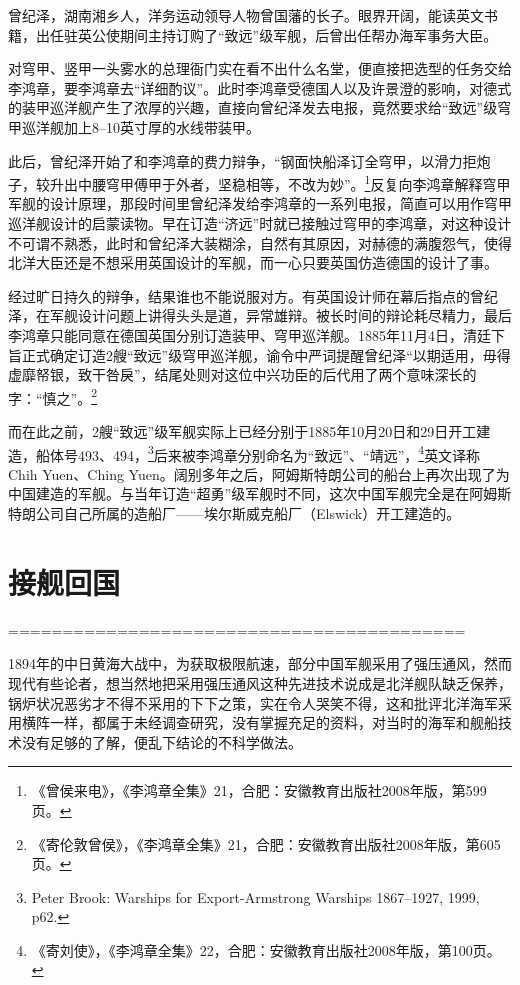 \documentclass[12pt,UTF8]{ctexbook}
\begin{document}
曾纪泽，湖南湘乡人，洋务运动领导人物曾国藩的长子。眼界开阔，能读英文书籍，出任驻英公使期间主持订购了“致远”级军舰，后曾出任帮办海军事务大臣。

对穹甲、竖甲一头雾水的总理衙门实在看不出什么名堂，便直接把选型的任务交给李鸿章，要李鸿章去“详细酌议”。此时李鸿章受德国人以及许景澄的影响，对德式的装甲巡洋舰产生了浓厚的兴趣，直接向曾纪泽发去电报，竟然要求给“致远”级穹甲巡洋舰加上8--10英寸厚的水线带装甲。

此后，曾纪泽开始了和李鸿章的费力辩争，“钢面快船泽订全穹甲，以滑力拒炮子，较升出中腰穹甲傅甲于外者，坚稳相等，不改为妙”。\footnote{《曾侯来电》，《李鸿章全集》21，合肥：安徽教育出版社2008年版，第599页。}反复向李鸿章解释穹甲军舰的设计原理，那段时间里曾纪泽发给李鸿章的一系列电报，简直可以用作穹甲巡洋舰设计的启蒙读物。早在订造“济远”时就已接触过穹甲的李鸿章，对这种设计不可谓不熟悉，此时和曾纪泽大装糊涂，自然有其原因，对赫德的满腹怨气，使得北洋大臣还是不想采用英国设计的军舰，而一心只要英国仿造德国的设计了事。

经过旷日持久的辩争，结果谁也不能说服对方。有英国设计师在幕后指点的曾纪泽，在军舰设计问题上讲得头头是道，异常雄辩。被长时间的辩论耗尽精力，最后李鸿章只能同意在德国英国分别订造装甲、穹甲巡洋舰。1885年11月4日，清廷下旨正式确定订造2艘“致远”级穹甲巡洋舰，谕令中严词提醒曾纪泽“以期适用，毋得虚靡帑银，致干咎戾”，结尾处则对这位中兴功臣的后代用了两个意味深长的字：“慎之”。\footnote{《寄伦敦曾侯》，《李鸿章全集》21，合肥：安徽教育出版社2008年版，第605页。}

而在此之前，2艘“致远”级军舰实际上已经分别于1885年10月20日和29日开工建造，船体号493、494，\footnote{Peter Brook: Warships for Export-Armstrong Warships 1867--1927, 1999, p62.}后来被李鸿章分别命名为“致远”、“靖远”，\footnote{《寄刘使》，《李鸿章全集》22，合肥：安徽教育出版社2008年版，第100页。}英文译称 Chih Yuen、Ching Yuen。阔别多年之后，阿姆斯特朗公司的船台上再次出现了为中国建造的军舰。与当年订造“超勇”级军舰时不同，这次中国军舰完全是在阿姆斯特朗公司自己所属的造船厂——埃尔斯威克船厂（Elswick）开工建造的。

\section{接舰回国}


==========================================




1894年的中日黄海大战中，为获取极限航速，部分中国军舰采用了强压通风，然而现代有些论者，想当然地把采用强压通风这种先进技术说成是北洋舰队缺乏保养，锅炉状况恶劣才不得不采用的下下之策，实在令人哭笑不得，这和批评北洋海军采用横阵一样，都属于未经调查研究，没有掌握充足的资料，对当时的海军和舰船技术没有足够的了解，便乱下结论的不科学做法。
\end{document}
